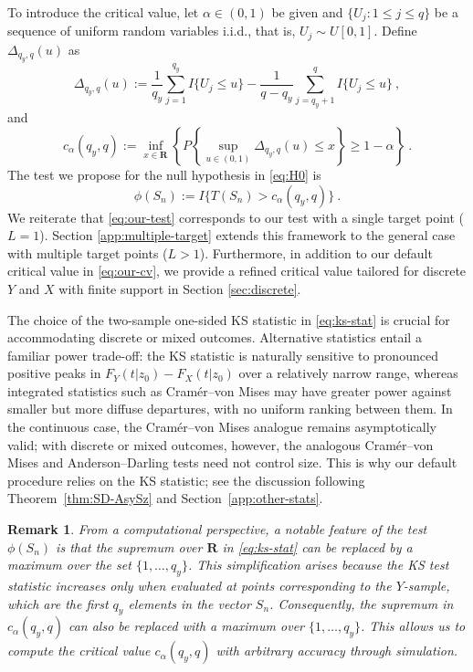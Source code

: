 \documentclass[11pt]{article}
\numberwithin{equation}{section}
\newtheorem{remark}{Remark}%
\begin{document}
To introduce the critical value, let $\alpha\in(0,1)$ be given and $\{U_j: 1\le j\le q\}$ be a sequence of uniform random variables i.i.d., that is, $U_j\sim U[0,1]$. Define $\Delta_{q_y,q}(u)$ as
\begin{equation}\label{eq:Delta-u}
    \Delta_{q_y,q}(u) := \frac{1}{q_y}\sum_{j=1}^{q_y} I\{U_{j} \le u\}-\frac{1}{q-q_y}\sum_{j=q_y+1}^{q} I\{U_{j} \le u\} ~,
\end{equation}
and
\begin{equation}\label{eq:our-cv}
  c_{\alpha}(q_y,q) := \inf_{x\in\mathbf R}\left\lbrace P\left\lbrace \sup_{u\in (0,1)} \Delta_{q_y,q}(u) \le x \right\rbrace\ge 1-\alpha \right\rbrace ~.
\end{equation}
The test we propose for the null hypothesis in \eqref{eq:H0} is 
\begin{equation}\label{eq:our-test}
  \phi(S_n) := I\{T(S_n)>c_{\alpha}(q_y,q)\}~.
\end{equation}
We reiterate that \eqref{eq:our-test} corresponds to our test with a single target point ($L = 1$). Section \ref{app:multiple-target} extends this framework to the general case with multiple target points ($L > 1$). Furthermore, in addition to our default critical value in \eqref{eq:our-cv}, we provide a refined critical value tailored for discrete $Y$ and $X$ with finite support in Section \ref{sec:discrete}.

The choice of the two-sample one-sided KS statistic in \eqref{eq:ks-stat} is crucial for accommodating discrete or mixed outcomes. Alternative statistics entail a familiar power trade-off: the KS statistic is naturally sensitive to pronounced positive peaks in $F_Y(t| z_0)-F_X(t| z_0)$ over a relatively narrow range, whereas integrated statistics such as Cram\'er--von Mises may have greater power against smaller but more diffuse departures, with no uniform ranking between them. In the continuous case, the Cram\'er--von Mises analogue remains asymptotically valid; with discrete or mixed outcomes, however, the analogous Cram\'er--von Mises and Anderson--Darling tests need not control size. This is why our default procedure relies on the KS statistic; see the discussion following Theorem~\ref{thm:SD-AsySz} and Section~\ref{app:other-stats}.

\begin{remark}\label{rem:c-approx}
From a computational perspective, a notable feature of the test $\phi(S_n)$ is that the supremum over $\mathbf{R}$ in \eqref{eq:ks-stat} can be replaced by a maximum over the set $\{1, \dots, q_y\}$. This simplification arises because the KS test statistic increases only when evaluated at points corresponding to the $Y$-sample, which are the first $q_y$ elements in the vector $S_n$. Consequently, the supremum in $c_{\alpha}(q_y, q)$ can also be replaced with a maximum over $\{1, \dots, q_y\}$. This allows us to compute the critical value $c_{\alpha}(q_y, q)$ with arbitrary accuracy through simulation.
\end{remark}
\end{document}
